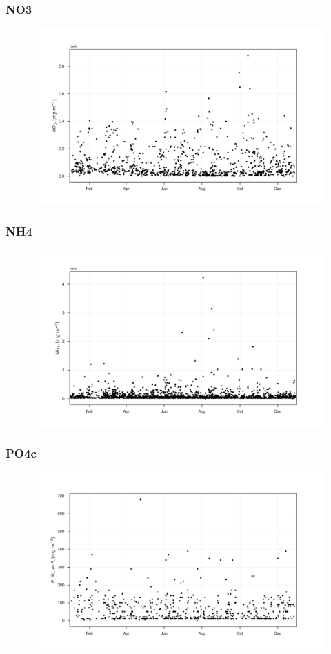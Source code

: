 \documentclass{beamer}
\begin{document}
\begin{frame}
\frametitle{NO3}
\begin{figure}
\includegraphics[width=\textwidth]{rivers/all/1yr_graph/NO3.png}
\end{figure}
\end{frame}

\begin{frame}
\frametitle{NH4}
\begin{figure}
\includegraphics[width=\textwidth]{rivers/all/1yr_graph/NH4.png}
\end{figure}
\end{frame}

\begin{frame}
\frametitle{PO4c}
\begin{figure}
\includegraphics[width=\textwidth]{rivers/all/1yr_graph/PO4c.png}
\end{figure}
\end{frame}
\end{document}

